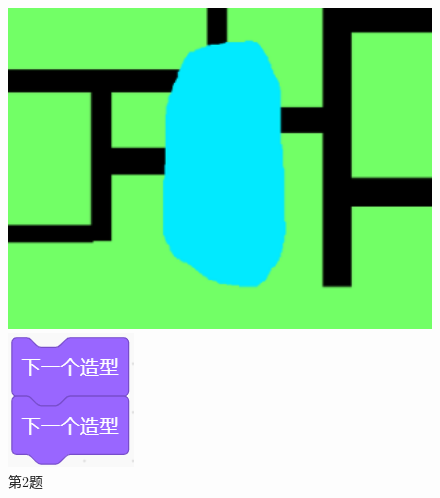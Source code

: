 \documentclass[10.5pt, a4paper]{article}
\begin{document}
\begin{enumerate}
        \begin{figure}[htbp]
            \centering
            \begin{minipage}[t]{.2\textwidth}
                \centering
                \includegraphics[width=1\textwidth]{2.png}
                \caption*{第2题}
            \end{minipage}
            \begin{minipage}[t]{.14\textwidth}
                \centering
                \includegraphics[width=\textwidth]{3.png}

\end{minipage}
\end{figure}
\end{enumerate}
\end{document}
